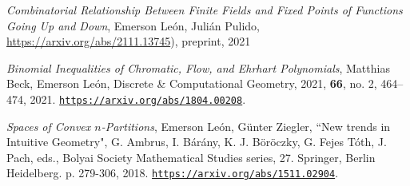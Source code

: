 \documentclass[]{plushcv}
\begin{document}
\begin{minipage}[t]{0.70\textwidth}
\begin{tightemize}
\item \emph{Combinatorial Relationship Between Finite Fields and Fixed Points of Functions Going Up and Down}, Emerson Le\'on, Juli\'an Pulido,  \url{https://arxiv.org/abs/2111.13745}), preprint, 2021
\end{tightemize}
\sectionsep

\begin{tightemize}
\item \emph{Binomial Inequalities of Chromatic, Flow, and Ehrhart Polynomials},  Matthias Beck, Emerson Le\'on, {Discrete \& Computational Geometry}, 2021, 
{\bf 66}, no. 2, 464–474, 2021. \href{https://arxiv.org/abs/1804.00208}{\texttt{https://arxiv.org/abs/1804.00208}}.

\item \emph{Spaces of Convex $n$-Partitions}, Emerson Le\'on, Günter Ziegler,  {``New trends in Intuitive Geometry"}, G. Ambrus, I. Bárány, K. J. Böröczky, G. Fejes Tóth, J. Pach, eds., Bolyai Society Mathematical Studies series, 27. Springer, Berlin Heidelberg. p. 279-306, 2018. \href{https://arxiv.org/abs/1511.02904}{\texttt{https://arxiv.org/abs/1511.02904}}.


\end{tightemize}
\sectionsep


%
%

\end{minipage} 
\hfill
\end{document}
